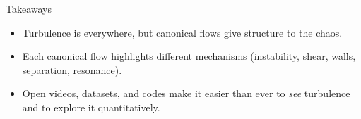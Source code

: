 \documentclass[aspectratio=169]{beamer}
\begin{document}
\begin{frame}{Takeaways}
\begin{itemize}
  \item Turbulence is everywhere, but canonical flows give structure to the chaos.
  \item Each canonical flow highlights different mechanisms (instability, shear, walls, separation, resonance).
  \item Open videos, datasets, and codes make it easier than ever to \emph{see} turbulence and to explore it quantitatively.
\end{itemize}

\vspace{0.8em}

\end{frame}
\end{document}
